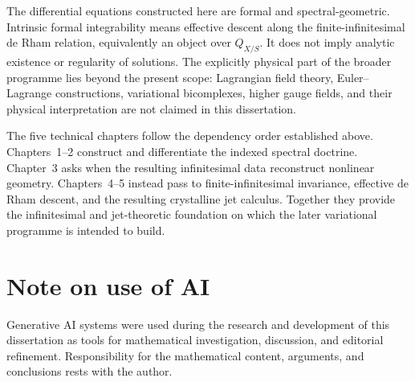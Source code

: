 The differential equations constructed here are formal and
spectral-geometric.  Intrinsic formal integrability means effective descent
along the finite-infinitesimal de Rham relation, equivalently an object over
\(Q_{X/S}\).  It does not imply analytic existence or regularity of
solutions.  The explicitly physical part of the broader programme lies beyond
the present scope: Lagrangian field theory, Euler--Lagrange constructions,
variational bicomplexes, higher gauge fields, and their physical
interpretation are not claimed in this dissertation.

The five technical chapters follow the dependency order established above.
Chapters~1--2 construct and differentiate the indexed spectral doctrine.
Chapter~3 asks when the resulting infinitesimal data reconstruct nonlinear
geometry.  Chapters~4--5 instead pass to finite-infinitesimal invariance,
effective de Rham descent, and the resulting crystalline jet calculus.
Together they provide the infinitesimal and jet-theoretic foundation on which
the later variational programme is intended to build.

\section*{Note on use of AI}
Generative AI systems were used during the research and development of this
dissertation as tools for mathematical investigation, discussion, and
editorial refinement.  Responsibility for the mathematical content,
arguments, and conclusions rests with the author.


\endgroup

